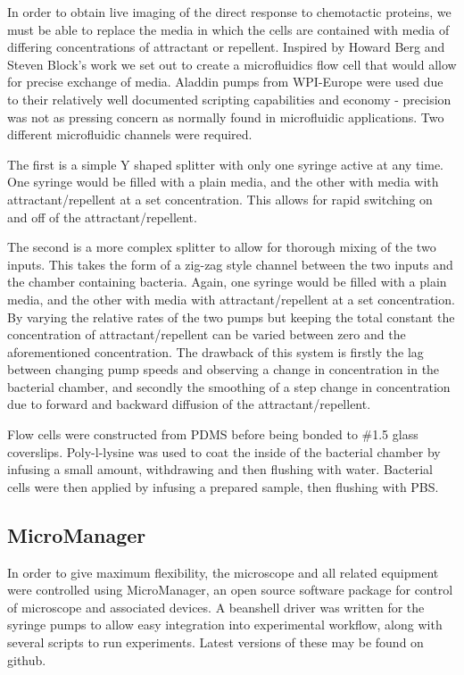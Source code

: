 \documentclass[../main.tex]{subfiles}
\begin{document}
In order to obtain live imaging of the direct response to chemotactic proteins, we must be able to replace the media in which the cells are contained with media of differing concentrations of attractant or repellent. Inspired by Howard Berg and Steven Block's work\cite{berg84} we set out to create a microfluidics flow cell that would allow for precise exchange of media. Aladdin pumps from WPI-Europe were used due to their relatively well documented scripting capabilities and economy - precision was not as pressing concern as normally found in microfluidic applications. Two different microfluidic channels were required.

The first is a simple Y shaped splitter with only one syringe active at any time. One syringe would be filled with a plain media, and the other with media with attractant/repellent at a set concentration. This allows for rapid switching on and off of the attractant/repellent.

The second is a more complex splitter to allow for thorough mixing of the two inputs. This takes the form of a zig-zag style channel between the two inputs and the chamber containing bacteria. Again, one syringe would be filled with a plain media, and the other with media with attractant/repellent at a set concentration. By varying the relative rates of the two pumps but keeping the total constant the concentration of attractant/repellent can be varied between zero and the aforementioned concentration. The drawback of this system is firstly the lag between changing pump speeds and observing a change in concentration in the bacterial chamber, and secondly the smoothing of a step change in concentration due to forward and backward diffusion of the attractant/repellent.

Flow cells were constructed from PDMS before being bonded to \#1.5 glass coverslips. Poly-l-lysine was used to coat the inside of the bacterial chamber by infusing a small amount, withdrawing and then flushing with water. Bacterial cells were then applied by infusing a prepared sample, then flushing with PBS.

\subsection{MicroManager}

In order to give maximum flexibility, the microscope and all related equipment were controlled using MicroManager\cite{micromanager}, an open source software package for control of microscope and associated devices. A beanshell driver was written for the syringe pumps to allow easy integration into experimental workflow, along with several scripts to run experiments. Latest versions of these may be found on github.
\end{document}
